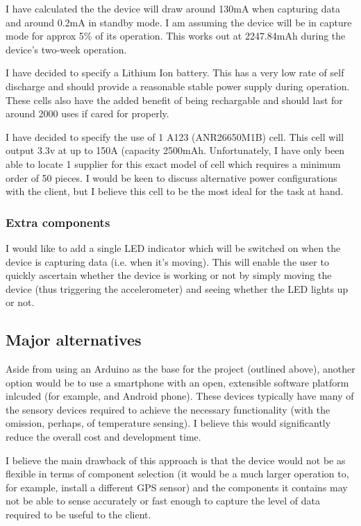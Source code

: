 \documentclass[a4paper, twoside]{article}
\begin{document}
I have calculated the the device will draw around 130mA when capturing data and
around 0.2mA in standby mode. I am assuming the device will be in capture mode
for approx 5\% of its operation. This works out at 2247.84mAh during the
device's two-week operation.

I have decided to specify a Lithium Ion battery. This has a very low rate of
self discharge and should provide a reasonable stable power supply during
operation. These cells also have the added benefit of being rechargable and
should last for around 2000 uses if cared for properly.

I have decided to specify the use of 1 A123 (ANR26650M1B) cell. This cell will output
3.3v at up to 150A (capacity 2500mAh. Unfortunately, I have only been able to
locate 1 supplier for this exact model of cell which requires a minimum order of
50 pieces. I would be keen to discuss alternative power configurations with the
client, but I believe this cell to be the most ideal for the task at hand.

\subsubsection{Extra components}
I would like to add a single LED indicator which will be switched on when the
device is capturing data (i.e. when it's moving). This will enable the user to
quickly ascertain whether the device is working or not by simply moving the
device (thus triggering the accelerometer) and seeing whether the LED lights up
or not.

\subsection{Major alternatives}
Aside from using an Arduino as the base for the project (outlined above),
another option would be to use a smartphone with an open, extensible software
platform inlcuded (for example, and Android phone). These devices typically have
many of the sensory devices required to achieve the necessary functionality
(with the omission, perhaps, of temperature sensing). I believe this would
significantly reduce the overall cost and development time.

I believe the main drawback of this approach is that the device would not be as
flexible in terms of component selection (it would be a much larger operation
to, for example, install a different GPS sensor) and the components it contains
may not be able to sense accurately or fast enough to capture the level of data
required to be useful to the client.
\end{document}
